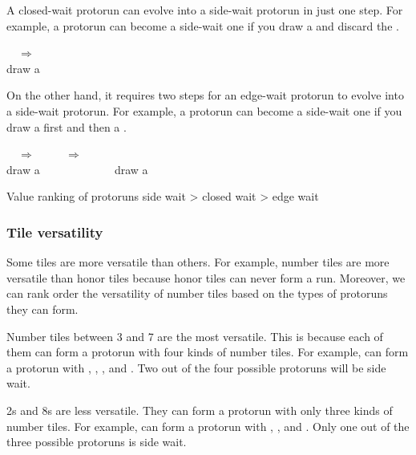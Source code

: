 \bigskip
A closed-wait protorun can evolve into a side-wait protorun in just one step. For example, a protorun {\large{}} can become a side-wait one if you draw a {\large{}} and discard the {\large{}}. 
\begin{center}
{\LARGE {} ~~$\Rightarrow$~~ }\\
draw a 
\end{center}
On the other hand, it requires two steps for an edge-wait protorun to evolve into a side-wait protorun. For example, a protorun {\large{}} can become a side-wait one if you draw a {\large{}} first and then a {\large{}}. 
\begin{center}
{\LARGE {} ~~$\Rightarrow$~~  ~~ $\Rightarrow$ ~~ 
}\\
draw a  ~~~~~~~~~~~~ draw a 
\end{center}

\bigskip

\begin{itembox}[c]{Value ranking of protoruns}
\centering
side wait > closed wait > edge wait
\end{itembox}

\bigskip

\subsubsection{Tile versatility} \label{sec:versatility}

Some tiles are more versatile than others. 
For example, number tiles are more versatile than honor tiles because honor tiles can never form a run. Moreover, we can rank order the versatility of number tiles based on the types of protoruns they can form.

\bigskip
Number tiles between 3 and 7 are the most versatile. This is because each of them can form a protorun with four kinds of number tiles. For example, {\large{}} can form a protorun with {\large{}}, {\large{}}, {\large{}}, and {\large{}}. Two out of the four possible protoruns will be side wait.

\bigskip
2s and 8s are less versatile. They can form a protorun with only three kinds of number tiles. For example, {\large{}} can form a protorun with {\large{}}, {\large{}}, and {\large{}}. Only one out of the three possible protoruns is side wait. 

